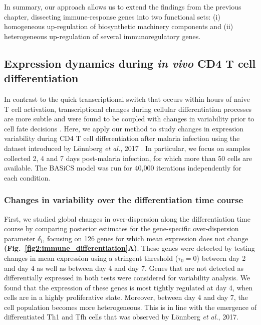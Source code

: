 \newpage

In summary, our approach allows us to extend the findings from the previous chapter, dissecting immune-response genes into two functional sets: (i) homogeneous up-regulation of biosynthetic machinery components and (ii) heterogeneous up-regulation of several immunoregulatory genes.

\subsection{Expression dynamics during \textit{in vivo} CD4\plus{} T cell differentiation}

In contrast to the quick transcriptional switch that occurs within hours of naive T cell activation, transcriptional changes during cellular differentiation processes are more subtle and were found to be coupled with changes in variability prior to cell fate decisions \citep{Richard2016, Mojtahedi2016}. Here, we apply our method to study changes in expression variability during CD4\plus{} T cell differentiation after malaria infection using the dataset introduced by L\"onnberg \emph{et al.}, 2017 \cite{Lonnberg2017}. In particular, we focus on samples collected 2, 4 and 7 days post-malaria infection, for which more than 50 cells are available. The BASiCS model was run for 40,000 iterations independently for each condition.

\subsubsection{Changes in variability over the differentiation time course}

First, we studied global changes in over-dispersion along the differentiation time course by comparing posterior estimates for the gene-specific over-dispersion parameter $\delta_i$, focusing on 126 genes for which mean expression does not change \textbf{(Fig.~\ref{fig2:immune_differentiation}A)}. These genes were detected by testing changes in mean expression using a stringent threshold ($\tau_0=0$) between day 2 and day 4 as well as between day 4 and day 7. Genes that are not detected as differentially expressed in both tests were considered for variability analysis. We found that the expression of these genes is most tightly regulated at day 4, when cells are in a highly proliferative state. Moreover, between day 4 and day 7, the cell population becomes more heterogeneous. This is in line with the emergence of differentiated Th1 and Tfh cells that was observed by L\"onnberg \emph{et al.}, 2017. \\

